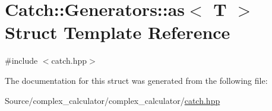 \hypertarget{struct_catch_1_1_generators_1_1as}{}\section{Catch\+:\+:Generators\+:\+:as$<$ T $>$ Struct Template Reference}
\label{struct_catch_1_1_generators_1_1as}


{\ttfamily \#include $<$catch.\+hpp$>$}



The documentation for this struct was generated from the following file\+:\begin{DoxyCompactItemize}
\item 
Source/complex\+\_\+calculator/complex\+\_\+calculator/\mbox{\hyperlink{catch_8hpp}{catch.\+hpp}}\end{DoxyCompactItemize}
